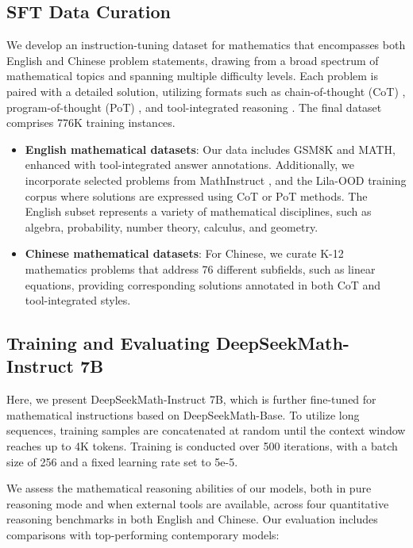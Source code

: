 \subsection{SFT Data Curation}

We develop an instruction-tuning dataset for mathematics that encompasses both English and Chinese problem statements, drawing from a broad spectrum of mathematical topics and spanning multiple difficulty levels. Each problem is paired with a detailed solution, utilizing formats such as chain-of-thought (CoT) \citep{cot}, program-of-thought (PoT) \citep{pot,pal}, and tool-integrated reasoning \citep{tora}. The final dataset comprises 776K training instances.

\begin{itemize}[topsep=0pt]
    \item \textbf{English mathematical datasets}: Our data includes GSM8K and MATH, enhanced with tool-integrated answer annotations. Additionally, we incorporate selected problems from MathInstruct \citep{MathInstruct}, and the Lila-OOD training corpus \citep{lila} where solutions are expressed using CoT or PoT methods. The English subset represents a variety of mathematical disciplines, such as algebra, probability, number theory, calculus, and geometry.
    \item \textbf{Chinese mathematical datasets}: For Chinese, we curate K-12 mathematics problems that address 76 different subfields, such as linear equations, providing corresponding solutions annotated in both CoT and tool-integrated styles.
\end{itemize}

\subsection{Training and Evaluating DeepSeekMath-Instruct 7B}

Here, we present DeepSeekMath-Instruct 7B, which is further fine-tuned for mathematical instructions based on DeepSeekMath-Base. To utilize long sequences, training samples are concatenated at random until the context window reaches up to 4K tokens. Training is conducted over 500 iterations, with a batch size of 256 and a fixed learning rate set to 5e-5.

We assess the mathematical reasoning abilities of our models, both in pure reasoning mode and when external tools are available, across four quantitative reasoning benchmarks in both English and Chinese. Our evaluation includes comparisons with top-performing contemporary models:

